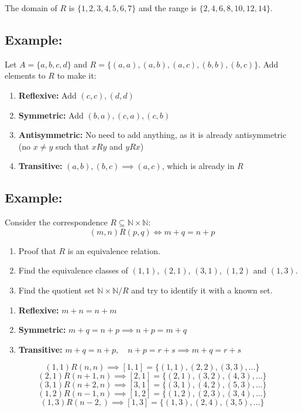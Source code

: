 \documentclass[11pt]{article}
\begin{document}
The domain of $R$ is $\{1,2,3,4,5,6,7\}$ and the range is $\{2,4,6,8,10,12,14\}$.

\subsection*{Example:}
Let $A = \{a,b,c,d\}$ and $R = \{(a,a), (a,b), (a,c), (b,b), (b,c)\}$. Add elements to $R$ to make it:
\begin{enumerate}
    \item \textbf{Reflexive:} Add $(c,c), (d,d)$
    \item \textbf{Symmetric:} Add $(b,a), (c,a), (c,b)$
    \item \textbf{Antisymmetric:} No need to add anything, as it is already antisymmetric (no $x \neq y$ such that $xRy$ and $yRx$)
    \item \textbf{Transitive:} $(a,b), (b,c) \implies (a,c)$, which is already in $R$
\end{enumerate}

\subsection*{Example:}
Consider the correspondence $R \subseteq \mathbb{N} \times \mathbb{N}$:
\[
(m,n) R (p,q) \Longleftrightarrow m + q = n + p
\]

\begin{enumerate}
    \item Proof that $R$ is an equivalence relation.
    \item Find the equivalence classes of $(1,1)$, $(2,1)$, $(3,1)$, $(1,2)$ and $(1,3)$.
    \item Find the quotient set $\mathbb{N} \times \mathbb{N}/R$ and try to identify it with a known set.
\end{enumerate}

\begin{enumerate}
    \item \textbf{Reflexive:} $m + n = n + m$
    \item \textbf{Symmetric:} $m + q = n + p \implies n + p = m + q$
    \item \textbf{Transitive:} $m + q = n + p, \quad n + p = r + s \implies m + q = r + s$
\end{enumerate}

\[
(1,1) R (n,n) \implies [1,1] = \{(1,1), (2,2), (3,3), \ldots\}
\]
\[
(2,1) R (n+1,n) \implies [2,1] = \{(2,1), (3,2), (4,3), \ldots\}
\]
\[
(3,1) R (n+2,n) \implies [3,1] = \{(3,1), (4,2), (5,3), \ldots\}
\]
\[
(1,2) R (n-1,n) \implies [1,2] = \{(1,2), (2,3), (3,4), \ldots\}
\]
\[
(1,3) R (n-2,) \implies [1,3] = \{(1,3), (2,4), (3,5), \ldots\}
\]
\end{document}
